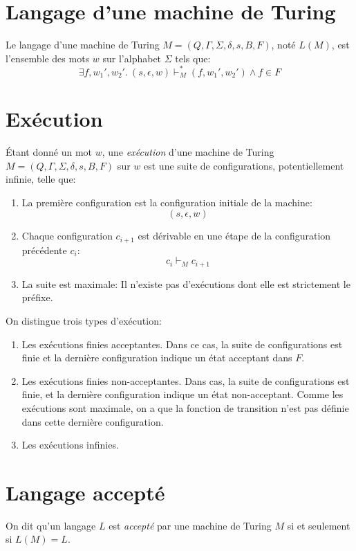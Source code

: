 \section{Langage d'une machine de Turing}

Le langage d'une machine de Turing $M = (Q, \Gamma, \Sigma, \delta, s, B, F)$, noté $L(M)$, est l'ensemble des mots $w$ sur l'alphabet $\Sigma$ tels que:
\[
\exists f, w_1', w_2'.\ (s, \epsilon, w) \vdash_M^* (f, w_1', w_2') \wedge f \in F
\]

\section{Exécution}

Étant donné un mot $w$, une \og \textit{exécution} \fg{} d'une machine de Turing $M = (Q, \Gamma, \Sigma, \delta, s, B, F)$ sur $w$ est une suite de configurations, potentiellement infinie, telle que:
\begin{enumerate}
\item La première configuration est la configuration initiale de la machine:
\[
(s, \epsilon, w)
\]
\item
Chaque configuration $c_{i+1}$ est dérivable en une étape de la configuration précédente $c_i$:
\[
c_i \vdash_M c_{i+1}
\]
\item
La suite est maximale: Il n'existe pas d'exécutions dont elle est strictement le préfixe.
\end{enumerate}
On distingue trois types d'exécution:
\begin{enumerate}
\item Les exécutions finies acceptantes. Dans ce cas, la suite de configurations est finie et la dernière configuration indique un état acceptant dans $F$.
\item Les exécutions finies non-acceptantes. Dans cas, la suite de configurations est finie, et la dernière configuration indique un état non-acceptant. Comme les exécutions sont maximale, on a que la fonction de transition n'est pas définie dans cette dernière configuration.
\item Les exécutions infinies.
\end{enumerate}

\section{Langage accepté}

On dit qu'un langage $L$ est \og \textit{accepté} \fg{} par une machine de Turing $M$ si et seulement si $L(M) = L$.

